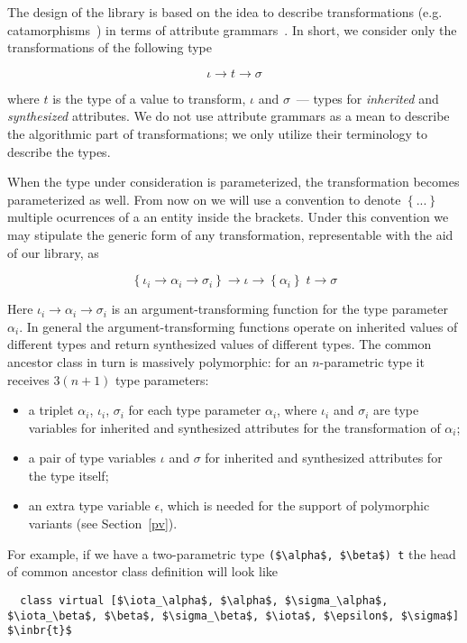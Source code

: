 The design of the library is based on the idea to describe transformations (e.g. catamorphisms~\cite{Bananas}) in terms of attribute grammars~\cite{AGKnuth,AGSwierstra,ObjectAlgebrasAttribute}.
In short, we consider only the transformations of the following type

\[
\iota \to t \to \sigma
\]

where $t$ is the type of a value to transform, $\iota$ and $\sigma$~--- types for \emph{inherited} and \emph{synthesized} attributes. We do not use attribute
grammars as a mean to describe the algorithmic part of transformations; we only utilize their terminology to describe the types. 

When the type under consideration is parameterized, the transformation becomes parameterized as well. From now on we will use a convention to
denote $\left\{...\right\}$ multiple ocurrences of a an entity inside the brackets. Under this convention we may stipulate the generic form of
any transformation, representable with the aid of our library, as

\[
  \left\{\iota_i \to \alpha_i \to \sigma_i\right\}\to\iota \to\left\{\alpha_i\right\}\;t \to \sigma
\]

Here $\iota_i\to\alpha_i\to\sigma_i$ is an argument-transforming function for the type parameter $\alpha_i$. In general the argument-transforming functions operate on
inherited values of different types and return synthesized values of different types. The common ancestor class in turn is massively polymorphic: for an $n$-parametric
type it receives $3(n+1)$ type parameters:

\begin{itemize}
\item a triplet $\alpha_i$, $\iota_i$, $\sigma_i$ for each type parameter $\alpha_i$, where $\iota_i$ and $\sigma_i$ are type variables for inherited and
  synthesized attributes for the transformation of $\alpha_i$;
\item a pair of type variables $\iota$ and $\sigma$ for inherited and synthesized attributes for the type itself;
\item an extra type variable $\epsilon$, which is needed for the support of polymorphic variants (see Section~\ref{pv}).
\end{itemize}

For example, if we have a two-parametric type \lstinline{($\alpha$, $\beta$) t} the head of common ancestor class definition will look like

\begin{lstlisting}
  class virtual [$\iota_\alpha$, $\alpha$, $\sigma_\alpha$, $\iota_\beta$, $\beta$, $\sigma_\beta$, $\iota$, $\epsilon$, $\sigma$] $\inbr{t}$
\end{lstlisting}

